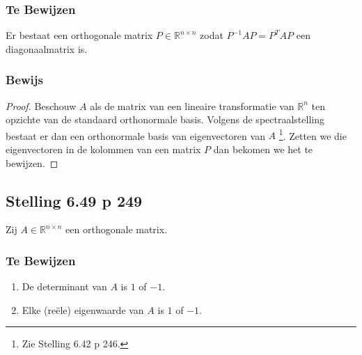 \documentclass[lineaire_algebra_oplossingen.tex]{subfiles}
\begin{document}
\subsubsection*{Te Bewijzen}
Er bestaat een orthogonale matrix $P\in \mathbb{R}^{n\times n}$ zodat $P^{-1}AP = P^TAP$ een diagonaalmatrix is.

\subsubsection*{Bewijs}
\begin{proof}
Beschouw $A$ als de matrix van een lineaire transformatie van $\mathbb{R}^n$ ten opzichte van de standaard orthonormale basis.
Volgens de spectraalstelling bestaat er dan een orthonormale basis van eigenvectoren van $A$ \footnote{Zie Stelling 6.42 p 246.}.
Zetten we die eigenvectoren in de kolommen van een matrix $P$ dan bekomen we het te bewijzen.
\end{proof}


\subsection{Stelling 6.49 p 249}
\label{6.49}
Zij $A\in \mathbb{R}^{n\times n}$ een orthogonale matrix.

\subsubsection*{Te Bewijzen}
\begin{enumerate}
\item De determinant van $A$ is $1$ of $-1$.
\item Elke (re\"ele) eigenwaarde van $A$ is $1$ of $-1$.
\end{enumerate}
\end{document}
